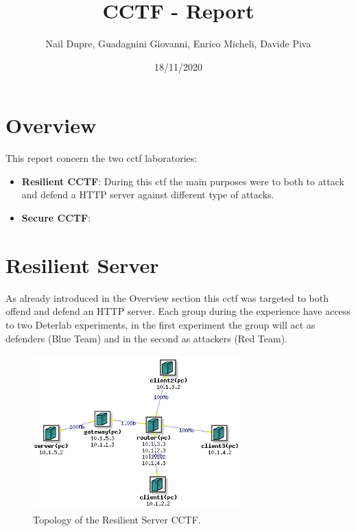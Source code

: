 \documentclass[14pt]{article}
\title{CCTF - Report}
\date{18/11/2020}
\author{Nail Dupre, Guadagnini Giovanni, Enrico Micheli, Davide Piva}
\begin{document}
	
\maketitle
	
\tableofcontents
\newpage
\section{Overview}
This report concern the two cctf laboratories:
\begin{itemize}
	\item \textbf{Resilient CCTF}: During this ctf the main purposes were to both to attack and defend a HTTP server against different type of attacks.
	\item \textbf{Secure CCTF}: 
\end{itemize}

\section{Resilient Server}
As already introduced in the Overview section this cctf was targeted to both offend and defend an HTTP server. Each group during the experience have access to two Deterlab experiments, in the first experiment the group will act as defenders (Blue Team) and in the second as attackers (Red Team).

\begin{figure}[!h]
	\centering
	\includegraphics[width=8cm,height=6cm]{ResilientServerTopology}
	\caption{Topology of the Resilient Server CCTF.}
\end{figure}
\end{document}
